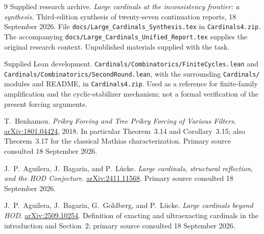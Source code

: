 \documentclass[11pt,letterpaper]{article}
\theoremstyle{definition}
\numberwithin{equation}{section}
\newcommand{\arxiv}[1]{\href{https://arxiv.org/abs/#1}{arXiv:#1}}
\begin{document}
\begin{thebibliography}{9}
Supplied research archive. \emph{Large cardinals at the inconsistency frontier: a synthesis}. Third-edition synthesis of twenty-seven continuation reports, 18 September 2026. File \nolinkurl{docs/Large_Cardinals_Synthesis.tex} in \nolinkurl{Cardinals4.zip}. The accompanying \nolinkurl{docs/Large_Cardinals_Unified_Report.tex} supplies the original research context. Unpublished materials supplied with the task.

Supplied Lean development. \nolinkurl{Cardinals/Combinatorics/FiniteCycles.lean} and \nolinkurl{Cardinals/Combinatorics/SecondRound.lean}, with the surrounding \nolinkurl{Cardinals/} modules and README, in \nolinkurl{Cardinals4.zip}. Used as a reference for finite-family amplification and the cyclic-stabilizer mechanism; not a formal verification of the present forcing arguments.

T.~Benhamou. \emph{Prikry Forcing and Tree Prikry Forcing of Various Filters}. \arxiv{1801.04424}, 2018. In particular Theorem~3.14 and Corollary~3.15; also Theorem~3.17 for the classical Mathias characterization. Primary source consulted 18 September 2026.

J.~P.~Aguilera, J.~Bagaria, and P.~L\"ucke. \emph{Large cardinals, structural reflection, and the HOD Conjecture}. \arxiv{2411.11568}. Primary source consulted 18 September 2026.

J.~P.~Aguilera, J.~Bagaria, G.~Goldberg, and P.~L\"ucke. \emph{Large cardinals beyond HOD}. \arxiv{2509.10254}. Definition of exacting and ultraexacting cardinals in the introduction and Section~2; primary source consulted 18 September 2026.
\end{thebibliography}
\end{document}
